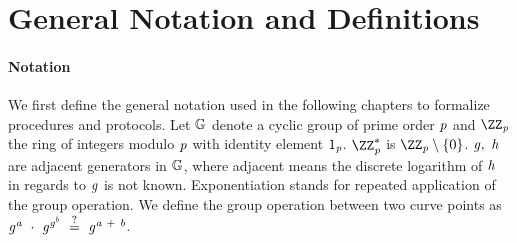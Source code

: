 

\section{General Notation and Definitions}\label{sec:generalNotationDefinitions}




\paragraph{Notation}
We first define the general notation used in the following chapters to formalize procedures and protocols. Let $\mathbb{G}$ denote a cyclic group of prime order $\mathit{p}$ and $\cnstIntegersPrime{\varPrime}$
the ring of integers modulo $\mathit{p}$ with identity element $1_{\mathit{p}}$. $\cnstIntegersPrimeWithoutZero{\varPrime}$ is $\cnstIntegersPrime{\varPrime} \opExcluding \funList{0}$.  $\mathit{g} ,~ \mathit{h}$ are adjacent
generators in $\mathbb{G}$, where adjacent means the discrete logarithm of $\mathit{h}$ in regards to $\mathit{g}$ is not known. Exponentiation stands for repeated application of the group operation. We define the group operation between two curve points as
$\mathit{g}^{\mathit{a}} ~\cdot~ \mathit{g}^{\mathit{g}^{\mathit{b}}} ~\stackrel{?}{=}~ \mathit{g}^{\mathit{a} ~+~ \mathit{b}}$.


